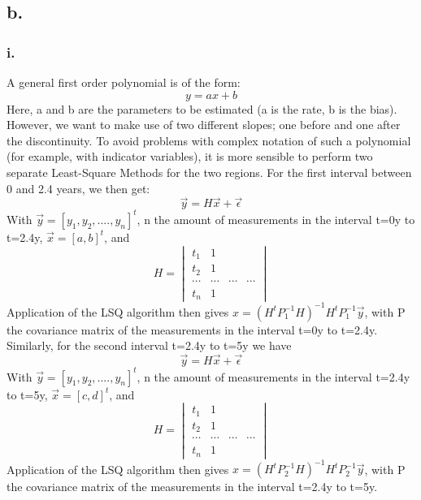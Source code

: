 \documentclass[a4paper,10pt,titlepage]{article}
\begin{document}
\subsection*{b.}
\subsubsection*{i.}
A general first order polynomial is of the form:
\begin{equation}
    y = ax + b
\end{equation}
Here, a and b are the parameters to be estimated (a is the rate, b is the bias). However, we want to make use of two different slopes; one before and one after the discontinuity. To avoid problems with complex notation of such a polynomial (for example, with indicator variables), it is more sensible to perform two separate Least-Square Methods for the two regions. For the first interval between 0 and 2.4 years, we then get:
\begin{equation}
    \vec{y} = H \vec{x} + \vec{\epsilon}
\end{equation}
With $\vec{y} = [y_1, y_2, ...., y_n]^t$, n the amount of measurements in the interval t=0y to t=2.4y, $\vec{x} = [a, b]^t$, and 
\begin{equation*}
    H = \begin{vmatrix}
    t_1 & 1 \\
    t_2 & 1 \\
    \cdots & \cdots & \cdots & \cdots \\
    t_n & 1 
\end{vmatrix}
\end{equation*}
Application of the LSQ algorithm then gives $\hat{x} = (H^t P_1^{-1} H)^{-1}H^t P_1^{-1}\vec{y}$, with P the covariance matrix of the measurements in the interval t=0y to t=2.4y. \\
Similarly, for the second interval t=2.4y to t=5y we have 
\begin{equation}
    \vec{y} = H \vec{x} + \vec{\epsilon}
\end{equation}
With $\vec{y} = [y_1, y_2, ...., y_n]^t$, n the amount of measurements in the interval t=2.4y to t=5y, $\vec{x} = [c, d]^t$, and
\begin{equation}
    H = \begin{vmatrix}
    t_1 & 1 \\
    t_2 & 1 \\
    \cdots & \cdots & \cdots & \cdots \\
    t_n & 1 
\end{vmatrix}
\end{equation}
Application of the LSQ algorithm then gives $\hat{x} = (H^t P_2^{-1} H)^{-1}H^tP_2^{-1}\vec{y}$, with P the covariance matrix of the measurements in the interval t=2.4y to t=5y. \\
\end{document}
